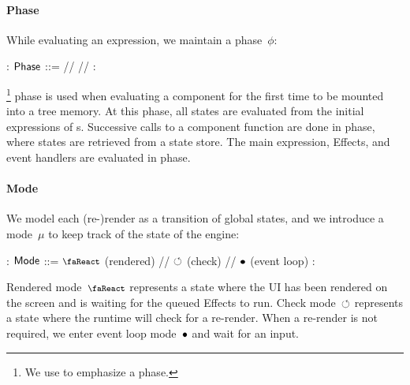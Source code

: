 \paragraph{Phase}
While evaluating an expression, we maintain a phase~$\phi$:
\begin{center}
  \begin{bnf}[rccll]
    \phi : $\textup{\textsf{Phase}}$ ::=  //  //  :
  \end{bnf}
\end{center}
\footnote{We use  to emphasize a phase.} phase is used when evaluating a component for the first time to be mounted into a tree memory.
At this phase, all states are evaluated from the initial expressions of s.
Successive calls to a component function are done in  phase, where states are retrieved from a state store.
The main expression, Effects, and event handlers are evaluated in  phase.


\paragraph{Mode}
We model each (re-)render as a transition of global states, and we introduce a mode~$\mu$ to keep track of the state of the \Rtrace{} engine:
\begin{center}
  \begin{bnf}[rccll]
    \mu : $\textup{\textsf{Mode}}$ ::= $\rendermode$ \textrm{(rendered)} // $\circlearrowleft$ \textrm{(check)} // $\bullet$ \textrm{(event loop)} :
  \end{bnf}
\end{center}
Rendered mode~$\rendermode$ represents a state where the UI has been rendered on the screen and is waiting for the queued Effects to run.
Check mode~$\circlearrowleft$ represents a state where the runtime will check for a re-render.
When a re-render is not required, we enter event loop mode~$\bullet$ and wait for an input.


